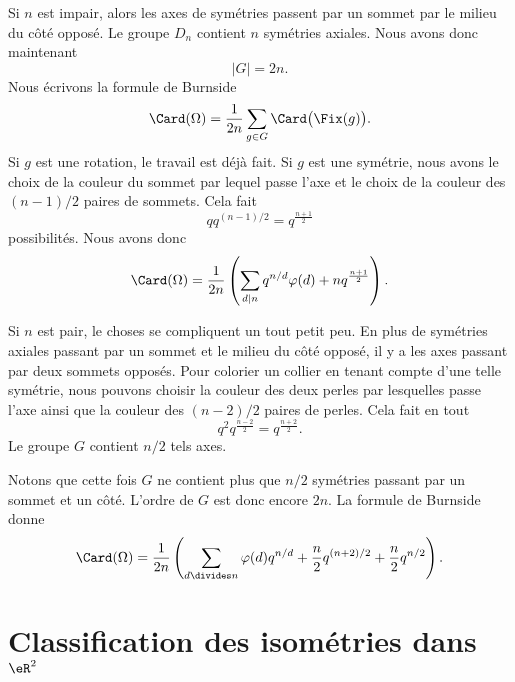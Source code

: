 Si \( n\) est impair, alors les axes de symétries passent par un sommet par le milieu du côté opposé. Le groupe \( D_n\) contient \( n\) symétries axiales. Nous avons donc maintenant
\begin{equation}
    | G |=2n.
\end{equation}
Nous écrivons la formule de Burnside
\begin{equation}
    \Card(\Omega)=\frac{1}{ 2n }\sum_{g\in G}\Card\big( \Fix(g) \big).
\end{equation}
Si \( g\) est une rotation, le travail est déjà fait. Si \( g\) est une symétrie, nous avons le choix de la couleur du sommet par lequel passe l'axe et le choix de la couleur des \( (n-1)/2\) paires de sommets. Cela fait
\begin{equation}
    qq^{(n-1)/2}=q^{\frac{ n+1 }{2}}
\end{equation}
possibilités. Nous avons donc
\begin{equation}
    \Card(\Omega)=\frac{1}{ 2n }\left( \sum_{d|n}q^{n/d}\varphi(d)+nq^{\frac{ n+1 }{2}} \right).
\end{equation}

Si \( n\) est pair, le choses se compliquent un tout petit peu. En plus de symétries axiales passant par un sommet et le milieu du côté opposé, il y a les axes passant par deux sommets opposés. Pour colorier un collier en tenant compte d'une telle symétrie, nous pouvons choisir la couleur des deux perles par lesquelles passe l'axe ainsi que la couleur des \( (n-2)/2\) paires de perles. Cela fait en tout
\begin{equation}
    q^2q^{\frac{ n-2 }{2}}=q^{\frac{ n+2 }{2}}.
\end{equation}
Le groupe \( G\) contient \( n/2\) tels axes.

Notons que cette fois \( G\) ne contient plus que \( n/2\) symétries passant par un sommet et un côté. L'ordre de $G$ est donc encore \( 2n\). La formule de Burnside donne
\begin{equation}
    \Card(\Omega)=\frac{1}{ 2n }\left( \sum_{d\divides n}\varphi(d)q^{n/d}+\frac{ n }{2}q^{(n+2)/2}+\frac{ n }{2}q^{n/2} \right).
\end{equation}

\section{Classification des isométries dans \( \eR^2\)}

